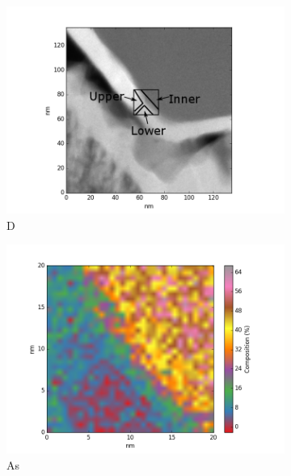 \begin{figure}
	\centering
	\begin{subfigure}{0.5\linewidth}
		\includegraphics[width=\linewidth]{fig/q/D-E/D}
		\caption{D}
		\label{fig:D-overview}
	\end{subfigure}%
	\hfill
	\begin{subfigure}{0.45\linewidth}
		\includegraphics[width=\linewidth]{fig/q-new/D/oldzeta/As_zeta}
		\caption{As}
		\label{fig:Das}
	\end{subfigure}
	\hfill
	\begin{subfigure}{0.45\linewidth}

\end{subfigure}
\end{figure}
